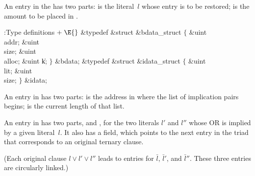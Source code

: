 An entry in the  has two parts:  is the literal~$l$
whose 
entry is to be restored;  is the amount to be placed in .

\Y\B\4:Type definitions\X${}\mathrel+\E{}$\6
\&{typedef} \&{struct} \&{bdata\_struct} ${}\{{}$\1\6
\&{uint} \\{addr};\6
\&{uint} \\{size};\6
\&{uint} \\{alloc};\6
\&{uint} \|k;\2\6
${}\}{}$ \&{bdata};\6
\&{typedef} \&{struct} \&{idata\_struct} ${}\{{}$\1\6
\&{uint} \\{lit};\6
\&{uint} \\{size};\2\6
${}\}{}$ \&{idata};\par
\fi

An entry in  has two parts:  is
the address in  where
the list of implication pairs begins;  is the current length
of that list.

An entry in  has two parts,  and , for the two
literals
$l'$ and $l''$ whose {\mc OR} is implied by a given literal~$l$.
It also has a  field, which points to the next  entry
in the triad
that corresponds to an original ternary clause.

(Each original clause $l\lor l'\lor l''$ leads to  entries for $%
\bar l$,
$\bar l'$, and $\bar l''$. These three entries are circularly linked.)

